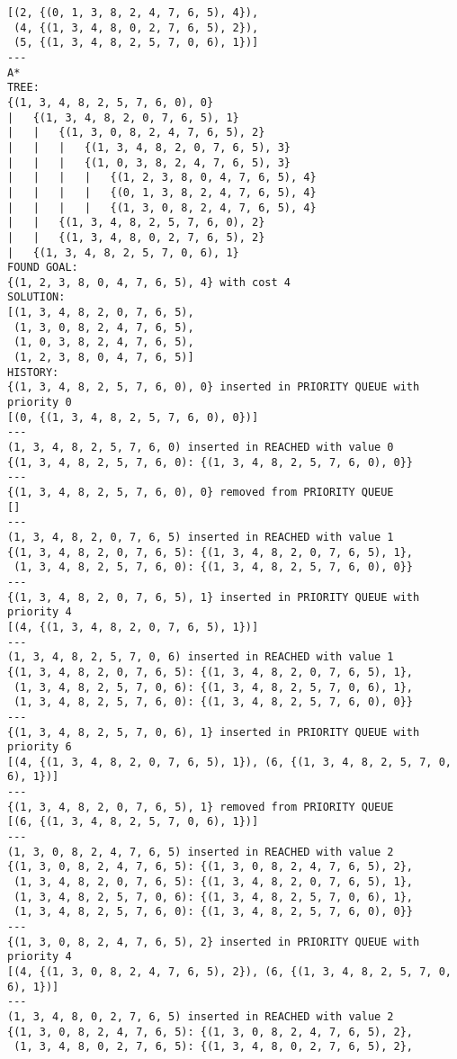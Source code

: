 \documentclass{article}
\begin{document}
\begin{verbatim}
[(2, {(0, 1, 3, 8, 2, 4, 7, 6, 5), 4}),
 (4, {(1, 3, 4, 8, 0, 2, 7, 6, 5), 2}),
 (5, {(1, 3, 4, 8, 2, 5, 7, 0, 6), 1})]
---
A*
TREE:
{(1, 3, 4, 8, 2, 5, 7, 6, 0), 0}
|   {(1, 3, 4, 8, 2, 0, 7, 6, 5), 1}
|   |   {(1, 3, 0, 8, 2, 4, 7, 6, 5), 2}
|   |   |   {(1, 3, 4, 8, 2, 0, 7, 6, 5), 3}
|   |   |   {(1, 0, 3, 8, 2, 4, 7, 6, 5), 3}
|   |   |   |   {(1, 2, 3, 8, 0, 4, 7, 6, 5), 4}
|   |   |   |   {(0, 1, 3, 8, 2, 4, 7, 6, 5), 4}
|   |   |   |   {(1, 3, 0, 8, 2, 4, 7, 6, 5), 4}
|   |   {(1, 3, 4, 8, 2, 5, 7, 6, 0), 2}
|   |   {(1, 3, 4, 8, 0, 2, 7, 6, 5), 2}
|   {(1, 3, 4, 8, 2, 5, 7, 0, 6), 1}
FOUND GOAL:
{(1, 2, 3, 8, 0, 4, 7, 6, 5), 4} with cost 4
SOLUTION:
[(1, 3, 4, 8, 2, 0, 7, 6, 5),
 (1, 3, 0, 8, 2, 4, 7, 6, 5),
 (1, 0, 3, 8, 2, 4, 7, 6, 5),
 (1, 2, 3, 8, 0, 4, 7, 6, 5)]
HISTORY:
{(1, 3, 4, 8, 2, 5, 7, 6, 0), 0} inserted in PRIORITY QUEUE with priority 0
[(0, {(1, 3, 4, 8, 2, 5, 7, 6, 0), 0})]
---
(1, 3, 4, 8, 2, 5, 7, 6, 0) inserted in REACHED with value 0
{(1, 3, 4, 8, 2, 5, 7, 6, 0): {(1, 3, 4, 8, 2, 5, 7, 6, 0), 0}}
---
{(1, 3, 4, 8, 2, 5, 7, 6, 0), 0} removed from PRIORITY QUEUE
[]
---
(1, 3, 4, 8, 2, 0, 7, 6, 5) inserted in REACHED with value 1
{(1, 3, 4, 8, 2, 0, 7, 6, 5): {(1, 3, 4, 8, 2, 0, 7, 6, 5), 1},
 (1, 3, 4, 8, 2, 5, 7, 6, 0): {(1, 3, 4, 8, 2, 5, 7, 6, 0), 0}}
---
{(1, 3, 4, 8, 2, 0, 7, 6, 5), 1} inserted in PRIORITY QUEUE with priority 4
[(4, {(1, 3, 4, 8, 2, 0, 7, 6, 5), 1})]
---
(1, 3, 4, 8, 2, 5, 7, 0, 6) inserted in REACHED with value 1
{(1, 3, 4, 8, 2, 0, 7, 6, 5): {(1, 3, 4, 8, 2, 0, 7, 6, 5), 1},
 (1, 3, 4, 8, 2, 5, 7, 0, 6): {(1, 3, 4, 8, 2, 5, 7, 0, 6), 1},
 (1, 3, 4, 8, 2, 5, 7, 6, 0): {(1, 3, 4, 8, 2, 5, 7, 6, 0), 0}}
---
{(1, 3, 4, 8, 2, 5, 7, 0, 6), 1} inserted in PRIORITY QUEUE with priority 6
[(4, {(1, 3, 4, 8, 2, 0, 7, 6, 5), 1}), (6, {(1, 3, 4, 8, 2, 5, 7, 0, 6), 1})]
---
{(1, 3, 4, 8, 2, 0, 7, 6, 5), 1} removed from PRIORITY QUEUE
[(6, {(1, 3, 4, 8, 2, 5, 7, 0, 6), 1})]
---
(1, 3, 0, 8, 2, 4, 7, 6, 5) inserted in REACHED with value 2
{(1, 3, 0, 8, 2, 4, 7, 6, 5): {(1, 3, 0, 8, 2, 4, 7, 6, 5), 2},
 (1, 3, 4, 8, 2, 0, 7, 6, 5): {(1, 3, 4, 8, 2, 0, 7, 6, 5), 1},
 (1, 3, 4, 8, 2, 5, 7, 0, 6): {(1, 3, 4, 8, 2, 5, 7, 0, 6), 1},
 (1, 3, 4, 8, 2, 5, 7, 6, 0): {(1, 3, 4, 8, 2, 5, 7, 6, 0), 0}}
---
{(1, 3, 0, 8, 2, 4, 7, 6, 5), 2} inserted in PRIORITY QUEUE with priority 4
[(4, {(1, 3, 0, 8, 2, 4, 7, 6, 5), 2}), (6, {(1, 3, 4, 8, 2, 5, 7, 0, 6), 1})]
---
(1, 3, 4, 8, 0, 2, 7, 6, 5) inserted in REACHED with value 2
{(1, 3, 0, 8, 2, 4, 7, 6, 5): {(1, 3, 0, 8, 2, 4, 7, 6, 5), 2},
 (1, 3, 4, 8, 0, 2, 7, 6, 5): {(1, 3, 4, 8, 0, 2, 7, 6, 5), 2},

\end{verbatim}
\end{document}
